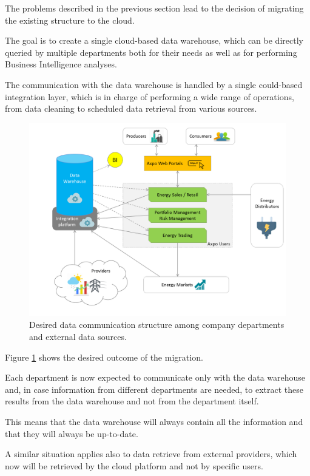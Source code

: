 The problems described in the previous section lead to the decision of migrating the existing structure to the cloud.

The goal is to create a single cloud-based data warehouse, which can be directly queried by multiple departments both for their needs as well as for performing Business Intelligence analyses.

The communication with the data warehouse is handled by a single could-based integration layer, which is in charge of performing a wide range of operations, from data cleaning to scheduled data retrieval from various sources.

\begin{figure}
    \centering
    \includegraphics[width=\textwidth]{res/architecture/arch_end.png}
    \caption{Desired data communication structure among company departments and external data sources.}
    \label{fig:architecture:end}
\end{figure}

Figure \ref{fig:architecture:end} shows the desired outcome of the migration.

Each department is now expected to communicate only with the data warehouse and, in case information from different departments are needed, to extract these results from the data warehouse and not from the department itself.

This means that the data warehouse will always contain all the information and that they will always be up-to-date.

A similar situation applies also to data retrieve from external providers, which now will be retrieved by the cloud platform and not by specific users.

